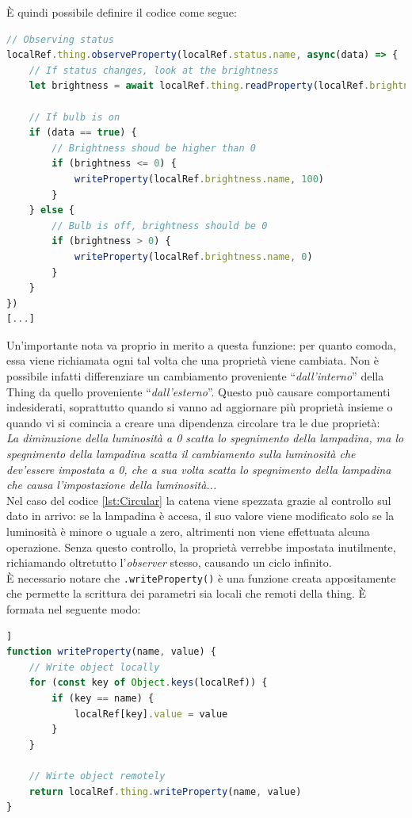 \documentclass[12pt,a4paper,openright,oneside]{report}
\newcommand{\quotes}[1]{``#1''}
\begin{document}
È quindi possibile definire il codice come segue:

\begin{lstlisting}[language=JavaScript,caption={Reagire al cambiamento delle proprietà in \texttt{bulb.js}}, label=lst:Circular]
// Observing status
localRef.thing.observeProperty(localRef.status.name, async(data) => {
	// If status changes, look at the brightness
	let brightness = await localRef.thing.readProperty(localRef.brightness.name)
	
	// If bulb is on
	if (data == true) {
		// Brightness shoud be higher than 0
		if (brightness <= 0) {
			writeProperty(localRef.brightness.name, 100)
		}
	} else {
		// Bulb is off, brightness should be 0
		if (brightness > 0) {
			writeProperty(localRef.brightness.name, 0)
		}
	}
})
[...]
\end{lstlisting}

Un'importante nota va proprio in merito a questa funzione: per quanto comoda, essa viene richiamata ogni tal volta che una proprietà viene cambiata. Non è possibile infatti differenziare un cambiamento proveniente \quotes{\textit{dall'interno}} della Thing da quello proveniente \quotes{\textit{dall'esterno}}. Questo può causare comportamenti indesiderati, soprattutto quando si vanno ad aggiornare più proprietà insieme o quando vi si comincia a creare una dipendenza circolare tra le due proprietà:\\

	\textit{La diminuzione della luminosità a 0 scatta lo spegnimento della lampadina, ma lo spegnimento della lampadina scatta il cambiamento sulla luminosità che dev'essere impostata a 0, che a sua volta scatta lo spegnimento della lampadina che causa l'impostazione della luminosità...}\\
	
Nel caso del codice \ref{lst:Circular} la catena viene spezzata grazie al controllo sul dato in arrivo: se la lampadina è accesa, il suo valore viene modificato solo se la luminosità è minore o uguale a zero, altrimenti non viene effettuata alcuna operazione. Senza questo controllo, la proprietà verrebbe impostata inutilmente, richiamando oltretutto l'\textit{observer} stesso, causando un ciclo infinito.\\ 
	
È necessario notare che \texttt{.writeProperty()} è una funzione creata appositamente che permette la scrittura dei parametri sia locali che remoti della thing. È formata nel seguente modo:

\begin{lstlisting}[language=JavaScript]]
function writeProperty(name, value) {
	// Write object locally
	for (const key of Object.keys(localRef)) {
		if (key == name) {
			localRef[key].value = value
		}
	}
	
	// Wirte object remotely
	return localRef.thing.writeProperty(name, value)
}
\end{lstlisting}
\end{document}
